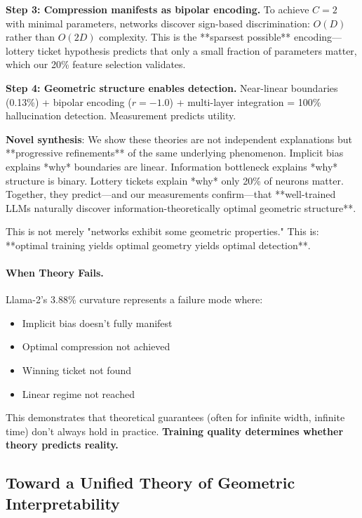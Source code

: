 \documentclass[11pt]{article}
\begin{document}
\textbf{Step 3: Compression manifests as bipolar encoding.}
To achieve $C=2$ with minimal parameters, networks discover sign-based discrimination: $O(D)$ rather than $O(2D)$ complexity. This is the **sparsest possible** encoding—lottery ticket hypothesis \citep{frankle2018lottery} predicts that only a small fraction of parameters matter, which our 20\% feature selection validates.

\textbf{Step 4: Geometric structure enables detection.}
Near-linear boundaries (0.13\%) + bipolar encoding ($r=-1.0$) + multi-layer integration = 100\% hallucination detection. Measurement predicts utility.

\textbf{Novel synthesis}: We show these theories are not independent explanations but **progressive refinements** of the same underlying phenomenon. Implicit bias explains *why* boundaries are linear. Information bottleneck explains *why* structure is binary. Lottery tickets explain *why* only 20\% of neurons matter. Together, they predict—and our measurements confirm—that **well-trained LLMs naturally discover information-theoretically optimal geometric structure**.

This is not merely "networks exhibit some geometric properties." This is: **optimal training yields optimal geometry yields optimal detection**.

\paragraph{When Theory Fails.}
Llama-2's 3.88\% curvature represents a failure mode where:
\begin{itemize}
    \item Implicit bias doesn't fully manifest
    \item Optimal compression not achieved
    \item Winning ticket not found
    \item Linear regime not reached
\end{itemize}

This demonstrates that theoretical guarantees (often for infinite width, infinite time) don't always hold in practice. \textbf{Training quality determines whether theory predicts reality.}


\subsection{Toward a Unified Theory of Geometric Interpretability}
\label{sec:unified_theory}
\end{document}

